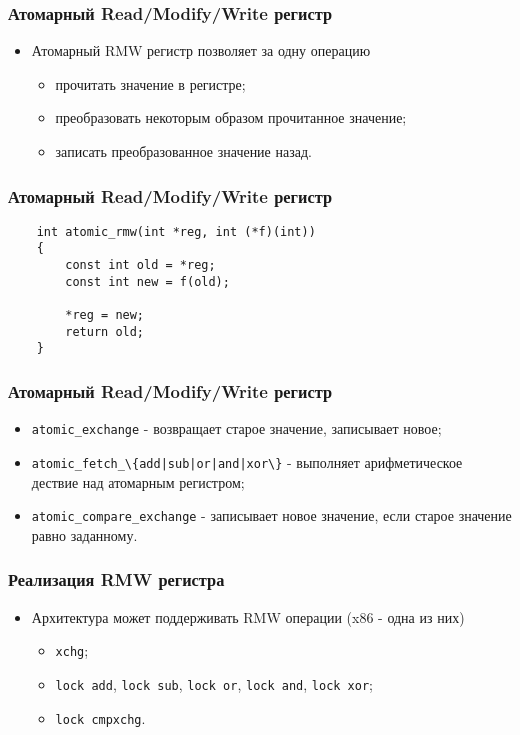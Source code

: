 \begin{frame}
\frametitle{Атомарный Read/Modify/Write регистр}
\begin{itemize}
    \item<1->Атомарный RMW регистр позволяет за одну операцию
    \begin{itemize}
        \item<2->прочитать значение в регистре;
        \item<3->преобразовать некоторым образом прочитанное значение;
        \item<4->записать преобразованное значение назад.
    \end{itemize}
\end{itemize}
\end{frame}

\begin{frame}[fragile]
\frametitle{Атомарный Read/Modify/Write регистр}
\begin{lstlisting}
    int atomic_rmw(int *reg, int (*f)(int))
    {
        const int old = *reg;
        const int new = f(old);

        *reg = new;
        return old;
    }
\end{lstlisting}
\end{frame}

\begin{frame}
\frametitle{Атомарный Read/Modify/Write регистр}
\begin{itemize}
    \item<1->\lstinline|atomic_exchange| - возвращает старое значение,
         записывает новое;
    \item<2->\lstinline;atomic_fetch_\{add|sub|or|and|xor\}; - выполняет
         арифметическое дествие над атомарным регистром;
    \item<3->\lstinline|atomic_compare_exchange| - записывает новое значение,
         если старое значение равно заданному.
\end{itemize}
\end{frame}

\begin{frame}
\frametitle{Реализация RMW регистра}
\begin{itemize}
    \item<1->Архитектура может поддерживать RMW операции (x86 - одна из них)
    \begin{itemize}
        \item<2->\lstinline|xchg|;
        \item<3->\lstinline|lock add|, \lstinline|lock sub|,
             \lstinline|lock or|, \lstinline|lock and|, \lstinline|lock xor|;
        \item<4->\lstinline|lock cmpxchg|.
    \end{itemize}
\end{itemize}
\end{frame}

